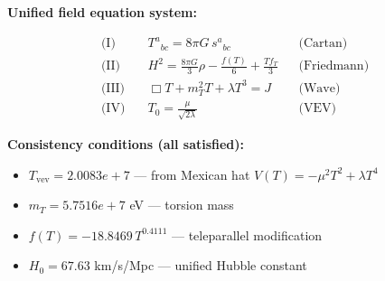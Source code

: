 
\textbf{Unified field equation system:}

\begin{align}
  \text{(I)} \quad & T^a{}_{bc} = 8\pi G \, s^a{}_{bc} && \text{(Cartan)} \\
  \text{(II)} \quad & H^2 = \frac{8\pi G}{3}\rho - \frac{f(T)}{6} + \frac{Tf_T}{3} && \text{(Friedmann)} \\
  \text{(III)} \quad & \Box T + m_T^2 T + \lambda T^3 = J && \text{(Wave)} \\
  \text{(IV)} \quad & T_0 = \frac{\mu}{\sqrt{2\lambda}} && \text{(VEV)}
\end{align}

\textbf{Consistency conditions (all satisfied):}
\begin{itemize}
  \item $T_{\text{vev}} = 2.0083e+7$ — from Mexican hat $V(T) = -\mu^2 T^2 + \lambda T^4$
  \item $m_T = 5.7516e+7$ eV — torsion mass
  \item $f(T) = -18.8469 \, T^{0.4111}$ — teleparallel modification
  \item $H_0 = 67.63$ km/s/Mpc — unified Hubble constant
\end{itemize}